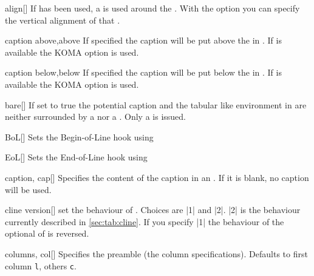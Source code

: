 \begin{describeopt}{align}[]%
  If  has been used, a  is used around the
  . With the  option you can specify the vertical
  alignment of that .
\end{describeopt}%
\begin{describeopt}{caption above,above}%
  If specified the caption will be put above the  in
  . If  is available the KOMA option
   is used.
\end{describeopt}%
\begin{describeopt}{caption below,below}%
  If specified the caption will be put below the  in
  . If  is available the KOMA option
   is used.
\end{describeopt}%
\begin{describeopt}{bare}[]%
  If set to true the potential caption and the tabular like environment in
   are neither surrounded by a  nor a .
  Only a  is issued.
\end{describeopt}%
\begin{describeopt}{BoL}[]%
  Sets the  Begin-of-Line hook using 
\end{describeopt}%
\begin{describeopt}{EoL}[]%
  Sets the  End-of-Line hook using 
\end{describeopt}%
\begin{describeopt}{caption, cap}[]%
  Specifies the content of the caption in an . If it is blank, no
  caption will be used.
\end{describeopt}%
\begin{describeopt}{cline version}[]%
  set the behaviour of . Choices are |1| and |2|. |2| is the
  behaviour currently described in \autoref{sec:tab:cline}. If you specify |1|
  the behaviour of the optional \meta{!} of  is reversed.
\end{describeopt}%
\begin{describeopt}{columns, col}[]%
  Specifies the  preamble (the column specifications). Defaults
  to first column \texttt{l}, others \texttt{c}.
\end{describeopt}%
